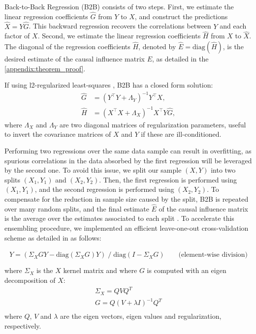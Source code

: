 \documentclass[preprint,12pt,3p]{elsarticle}
\begin{document}
Back-to-Back Regression (B2B) consists of two steps.
%
First, we estimate the linear regression coefficients $\hat G$ from $Y$ to $X$,
and construct the predictions $\hat X = Y \hat G$.
%
This backward regression recovers the correlations between $Y$ and each factor
of $X$.
%
Second, we estimate the linear regression coefficients $\hat H$ from $X$ to
$\hat X$.
%
The diagonal of the regression coefficients $\hat H$, denoted by $\hat{E} =
\text{diag}(\hat{H})$, is the desired estimate of the causal influence matrix
$E$, as detailed in the \ref{appendix:theorem_proof}.

If using l2-regularized least-squares \citep{hoerl1959optimum, rifkin2007notes},
B2B has a closed form solution:
\begin{align}
    \hat G &= (Y^\top Y + \Lambda_Y)^{-1} Y^\top X,\label{eq:solG}\\
    \hat H &=(X^\top X + \Lambda_X)^{-1} X^\top Y \hat G,\label{eq:solH}
\end{align}
%
where $\Lambda_X$ and $\Lambda_Y$ are two diagonal matrices of regularization
parameters, useful to invert the covariance matrices of $X$ and $Y$ if these are
ill-conditioned.

Performing two regressions over the same data sample can result in overfitting,
as spurious correlations in the data absorbed by the first regression will be
leveraged by the second one.
%
To avoid this issue, we split our sample $(X, Y)$ into two splits $(X_1, Y_1)$
and $(X_2, Y_2)$.
%
Then, the first regression is performed using $(X_1, Y_1)$, and the second
regression is performed using $(X_2, Y_2)$.
%
To compensate for the reduction in sample size caused by the split, B2B is
repeated over many random splits, and the final estimate $\hat E$ of the causal
influence matrix is the average over the estimates associated to each split
\citep{breiman1996bagging}.
%
To accelerate this ensembling procedure, we implemented an efficient
leave-one-out cross-validation scheme as detailed in \citep{rifkin2007notes}
as follows:
%

\begin{equation}
\hat{Y} = (\Sigma_X G Y - \text{diag}(\Sigma_X G) Y) \;/\; \text{diag}(I - \Sigma_X G) \qquad \text{(element-wise division)}
\end{equation}

where $\Sigma_X$ is the $X$ kernel matrix and where $G$ is computed with an
eigen decomposition of $X$:
\begin{equation}
  \begin{aligned}
  \Sigma_X = Q V Q^T \\
  G = Q (V + \lambda I)^{-1} Q^T\\
  \end{aligned}
\end{equation}
where $Q$, $V$ and $\lambda$ are the eigen vectors, eigen values and
regularization, respectively.
\end{document}
